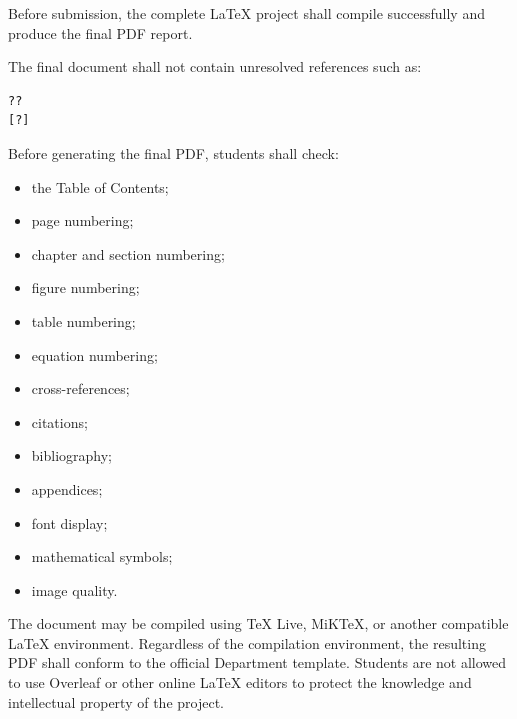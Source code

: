 {\vspace{0.3cm}



Before submission, the complete \LaTeX{} project shall compile
successfully and produce the final PDF report.

The final document shall not contain unresolved references such as:

\begin{verbatim}
??
[?]
\end{verbatim}

Before generating the final PDF, students shall check:

\begin{itemize}[leftmargin=0.8cm, itemsep=2pt]
    \item the Table of Contents;
    \item page numbering;
    \item chapter and section numbering;
    \item figure numbering;
    \item table numbering;
    \item equation numbering;
    \item cross-references;
    \item citations;
    \item bibliography;
    \item appendices;
    \item font display;
    \item mathematical symbols;
    \item image quality.
\end{itemize}

The document may be compiled using TeX Live, MiKTeX, or
another compatible \LaTeX{} environment. Regardless of the
compilation environment, the resulting PDF shall conform to the
official Department template. Students are not allowed to use Overleaf 
or other online \LaTeX{} editors to protect the 
knowledge and intellectual property of the project.

\vspace{0.3cm}


}
